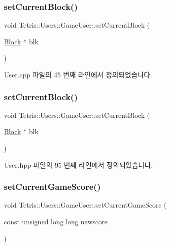 \subsubsection{\texorpdfstring{set\+Current\+Block()}{setCurrentBlock()}\hspace{0.1cm}{\footnotesize\ttfamily [1/2]}}
{\footnotesize\ttfamily void Tetris\+::\+Users\+::\+Game\+User\+::set\+Current\+Block (\begin{DoxyParamCaption}\item[{\hyperlink{class_tetris_1_1_block}{Block} $\ast$}]{blk }\end{DoxyParamCaption})}



User.\+cpp 파일의 45 번째 라인에서 정의되었습니다.

\mbox{\label{class_tetris_1_1_users_1_1_game_user_ae1743f8024d25ed74d7b2e456907ee41}} 
\subsubsection{\texorpdfstring{set\+Current\+Block()}{setCurrentBlock()}\hspace{0.1cm}{\footnotesize\ttfamily [2/2]}}
{\footnotesize\ttfamily void Tetris\+::\+Users\+::\+Game\+User\+::set\+Current\+Block (\begin{DoxyParamCaption}\item[{\hyperlink{class_tetris_1_1_block}{Block} $\ast$}]{blk }\end{DoxyParamCaption})\hspace{0.3cm}{\ttfamily [inline]}}



User.\+hpp 파일의 95 번째 라인에서 정의되었습니다.

\mbox{\label{class_tetris_1_1_users_1_1_game_user_aa37f3ed5891a4efecc09f92188b8a9cd}} 
\subsubsection{\texorpdfstring{set\+Current\+Game\+Score()}{setCurrentGameScore()}}
{\footnotesize\ttfamily void Tetris\+::\+Users\+::\+Game\+User\+::set\+Current\+Game\+Score (\begin{DoxyParamCaption}\item[{const unsigned long long}]{newscore }\end{DoxyParamCaption})\hspace{0.3cm}{\ttfamily [inline]}}



